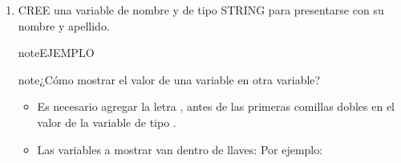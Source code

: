 \documentclass[letterpaper,10pt,spanish]{sphinxmanual}
\begin{document}
\begin{enumerate}
\item {} 
\sphinxAtStartPar
CREE una variable de nombre  y de tipo STRING para presentarse con su nombre y apellido.

\begin{sphinxadmonition}{note}{EJEMPLO}

\begin{sphinxVerbatim}[commandchars=\\\{\},numbers=left,firstnumber=1,stepnumber=1]
  
\end{sphinxVerbatim}
\end{sphinxadmonition}

\begin{sphinxadmonition}{note}{¿Cómo mostrar el valor de una variable en otra variable?}
\begin{itemize}
\item {} 
\sphinxAtStartPar
Es necesario agregar la letra , antes de las primeras comillas dobles en el valor de la variable de tipo .

\item {} 
\sphinxAtStartPar
Las variables a mostrar van dentro de llaves: \sphinxcode{\sphinxupquote{\{\}}}
Por ejemplo:

\end{itemize}

\begin{sphinxVerbatim}[commandchars=\\\{\},numbers=left,firstnumber=1,stepnumber=1]
  
  
     
\end{sphinxVerbatim}
\end{sphinxadmonition}


\end{enumerate}
\end{document}
